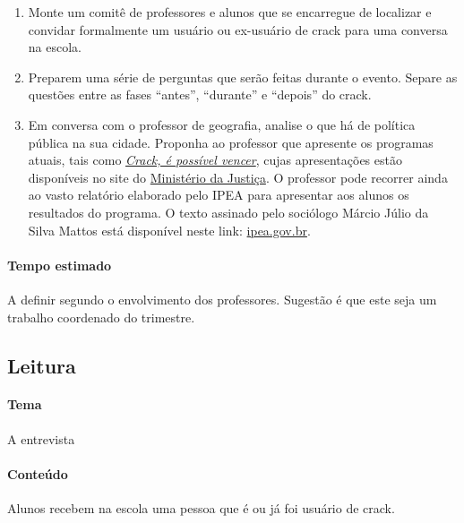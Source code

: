 \documentclass[12pt]{extarticle}
\begin{document}
\begin{enumerate}
	\item Monte um comitê de professores e alunos que se encarregue de 
	localizar e convidar formalmente um usuário ou ex-usuário de crack 
	para uma conversa na escola.

	\item Preparem uma série de perguntas que serão feitas durante 
	o evento. Separe as questões entre as fases ``antes'', ``durante'' 
	e ``depois'' do crack.

	\item Em conversa com o professor de geografia, analise o que há de 
	política pública na sua cidade. Proponha ao professor que apresente 
	os programas atuais, tais como 
	\href{https://www.justica.gov.br/news/conheca-o-programa-crack-e-possivel-vencer}{\emph{Crack, é possível vencer}}, cujas
	apresentações estão disponíveis no site do 
	\href{https://www.justica.gov.br/programas-e-planos/crack\#:~:text=O\%20Crack\%2C\%20\%C3\%A9\%20poss\%C3\%ADvel\%20vencer,\%3A\%20preven\%C3\%A7\%C3\%A3o\%2C\%20cuidado\%20e\%20autoridade}{Ministério da Justiça}.
	O professor pode recorrer ainda ao vasto relatório elaborado pelo IPEA para 
	apresentar aos alunos os resultados do programa. O texto assinado 
	pelo sociólogo Márcio Júlio da Silva Mattos está disponível 
	neste link: \href{https://www.ipea.gov.br/ppp/index.php/PPP/article/view/683}{ipea.gov.br}.
\end{enumerate}


\paragraph{Tempo estimado} A definir segundo o envolvimento dos professores. Sugestão é que 
	este seja um trabalho coordenado do trimestre. 

\subsection{Leitura}

\paragraph{Tema} A entrevista

\paragraph{Conteúdo} Alunos recebem na escola uma pessoa que é ou já foi usuário de crack.
\end{document}
